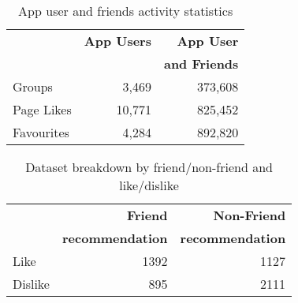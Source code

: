 \begin{table}
\centering
\begin{tabular}{|>{\small}l|>{\small}r|>{\small}r|}
\hline
& \textbf{App Users} & \textbf{App User} \\
& & \textbf{and Friends} \\
\hline
Groups & 3,469 & 373,608 \\
\hline
Page Likes & 10,771 & 825,452 \\
\hline
Favourites & 4,284 & 892,820\\
\hline
\end{tabular}
\caption{App user and friends activity statistics }
\label{tab:interests}
\end{table}

\begin{table}
\centering
\begin{tabular}{|>{\small}l|>{\small}r|>{\small}r|}\hline
&\textbf{Friend}  & \textbf{Non-Friend} \\
&\textbf{recommendation}  & \textbf{recommendation} \\
\hline
Like& 1392 & 1127 \\
\hline
Dislike& 895 & 2111\\
\hline
\end{tabular}
\caption{Dataset breakdown by friend/non-friend and like/dislike}
\label{tab:likeinfo}
\end{table}

